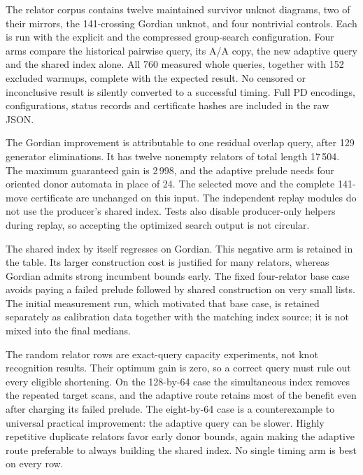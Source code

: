 The relator corpus contains twelve maintained survivor unknot diagrams,
two of their mirrors, the 141-crossing Gordian unknot, and four nontrivial
controls. Each is run with the explicit and the compressed group-search
configuration. Four arms compare the historical pairwise query, its A/A
copy, the new adaptive query and the shared index alone. All 760 measured
whole queries, together with 152 excluded warmups, complete with the
expected result. No censored or inconclusive result is silently converted
to a successful timing. Full PD encodings, configurations, status records
and certificate hashes are included in the raw JSON.



The Gordian improvement is attributable to one residual overlap query,
after 129 generator eliminations. It has twelve nonempty relators of
total length 17\,504. The maximum guaranteed gain is 2\,998, and the
adaptive prelude needs four oriented donor automata in place of 24.
The selected move and the complete 141-move certificate are unchanged on
this input. The independent replay modules do not use the producer's
shared index. Tests also disable producer-only helpers during replay,
so accepting the optimized search output is not circular.

The shared index by itself regresses on Gordian. This negative arm is
retained in the table. Its larger construction cost is justified for
many relators, whereas Gordian admits strong incumbent bounds early.
The fixed four-relator base case avoids paying a failed prelude followed
by shared construction on very small lists. The initial measurement run,
which motivated that base case, is retained separately as calibration
data together with the matching index source; it is not mixed into the
final medians.



The random relator rows are exact-query capacity experiments, not knot
recognition results. Their optimum gain is zero, so a correct query must
rule out every eligible shortening. On the 128-by-64 case the simultaneous
index removes the repeated target scans, and the adaptive route retains
most of the benefit even after charging its failed prelude. The eight-by-64
case is a counterexample to universal practical improvement: the adaptive
query can be slower. Highly repetitive duplicate relators favor early
donor bounds, again making the adaptive route preferable to always
building the shared index. No single timing arm is best on every row.

